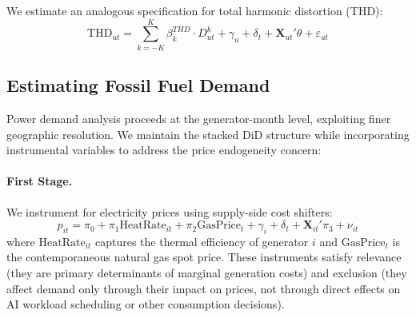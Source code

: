\documentclass[sigconf]{acmart}
\newcommand{\nb}[1]{\textcolor{blue}{NB[#1]}}
\begin{document}
We estimate an analogous specification for total harmonic distortion (THD):
\begin{equation}
\text{THD}_{ut} = \sum_{k=-K}^{K} \beta_k^{THD} \cdot D_{ut}^k + \gamma_u + \delta_t + \mathbf{X}_{ut}'\theta + \varepsilon_{ut}
\label{eq:thd_eventstudy}
\end{equation}


\subsection{Estimating Fossil Fuel Demand}

Power demand analysis proceeds at the generator-month level, exploiting finer geographic resolution. We maintain the stacked DiD structure while incorporating instrumental variables to address the price endogeneity concern:

\paragraph{First Stage.} We instrument for electricity prices using supply-side cost shifters:
\begin{equation}
p_{it} = \pi_0 + \pi_1 \text{HeatRate}_{it} + \pi_2 \text{GasPrice}_{t} + \gamma_i + \delta_t + \mathbf{X}_{it}'\pi_3 + \nu_{it}
\label{eq:firststage}
\end{equation}
where $\text{HeatRate}_{it}$ captures the thermal efficiency of generator $i$ and $\text{GasPrice}_t$ is the contemporaneous natural gas spot price. These instruments satisfy relevance (they are primary determinants of marginal generation costs) and exclusion (they affect demand only through their impact on prices, not through direct effects on AI workload scheduling or other consumption decisions).
\end{document}
